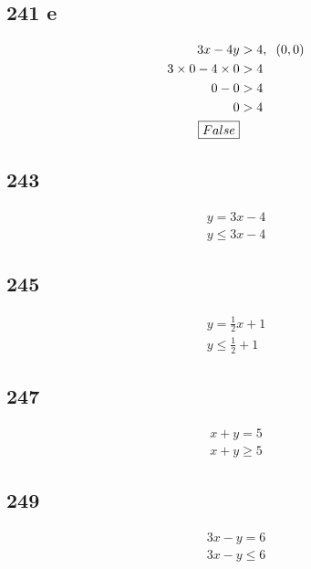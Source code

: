 \documentclass{article}
\begin{document}
    \subsection*{241 e}
    \begin{align*}
        3x - 4y &> 4, \hspace{.2cm}(0, 0)\\
        3 \times 0 - 4 \times 0 &> 4\\
        0 - 0 &> 4 \\
        0 &> 4\\
        \boxed{False}
    \end{align*}

    \subsection*{243}
    \begin{align*}
        y = 3x - 4\\
        \boxed{y \leq 3x - 4}
    \end{align*}

    \subsection*{245}
    \begin{align*}
        y = \frac{1}{2}x + 1\\
        \boxed{y \leq \frac{1}{2} + 1}
    \end{align*}

    \subsection*{247}
    \begin{align*}
        x + y = 5 \\
        \boxed{x + y \geq 5}
    \end{align*}

    \subsection*{249}
    \begin{align*}
        3x - y = 6 \\
        \boxed{3x - y \leq 6}
    \end{align*}
\end{document}
